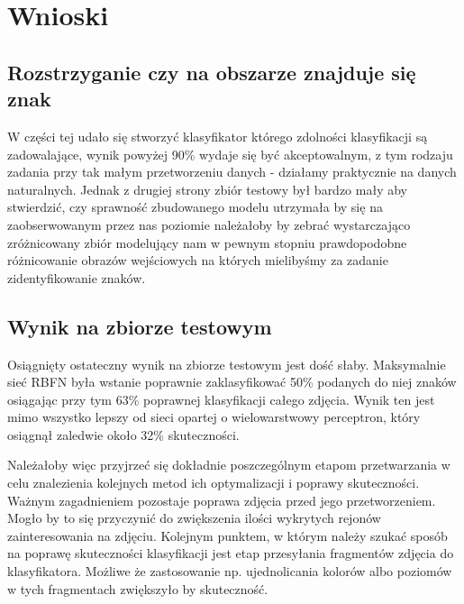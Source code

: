 \documentclass{classrep}
\begin{document}
\section{Wnioski}

\subsection{Rozstrzyganie czy na obszarze znajduje się znak}
W części tej udało się stworzyć klasyfikator którego zdolności klasyfikacji są zadowalające, wynik powyżej 90\% wydaje się być akceptowalnym, z tym rodzaju zadania przy tak małym przetworzeniu danych - działamy praktycznie na danych naturalnych. Jednak z drugiej strony zbiór testowy był bardzo mały aby stwierdzić, czy sprawność zbudowanego modelu utrzymała by się na zaobserwowanym przez nas poziomie należałoby by zebrać wystarczająco zróżnicowany zbiór modelujący nam w pewnym stopniu prawdopodobne różnicowanie obrazów wejściowych na których mielibyśmy za zadanie zidentyfikowanie znaków. 

\subsection{Wynik na zbiorze testowym}

Osiągnięty ostateczny wynik na zbiorze testowym jest dość słaby. Maksymalnie sieć RBFN była wstanie poprawnie zaklasyfikować 50\% podanych do niej znaków osiągając przy tym 63\% poprawnej klasyfikacji całego zdjęcia. Wynik ten jest mimo wszystko lepszy od sieci opartej o wielowarstwowy perceptron, który osiągnął zaledwie około 32\% skuteczności.

Należałoby więc przyjrzeć się dokładnie poszczególnym etapom przetwarzania w celu znalezienia kolejnych metod ich optymalizacji i poprawy skuteczności. Ważnym zagadnieniem pozostaje poprawa zdjęcia przed jego przetworzeniem. Mogło by to się przyczynić do zwiększenia ilości wykrytych rejonów zainteresowania na zdjęciu. Kolejnym punktem, w którym należy szukać sposób na poprawę skuteczności klasyfikacji jest etap przesyłania fragmentów zdjęcia do klasyfikatora. Możliwe że zastosowanie np. ujednolicania kolorów albo poziomów w tych fragmentach zwiększyło by skuteczność.

%


\end{document}
